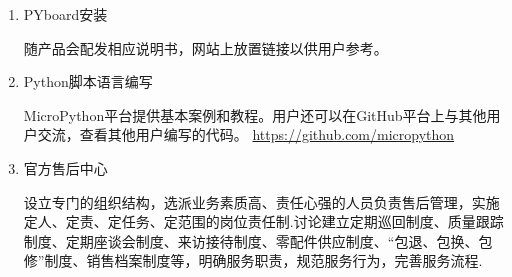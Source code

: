 \begin{enumerate}[(1)]
\item PYboard安装

      随产品会配发相应说明书，网站上放置链接以供用户参考。

\item Python脚本语言编写

      MicroPython平台提供基本案例和教程。用户还可以在GitHub平台上与其他用户交流，查看其他用户编写的代码。
      \url{https://github.com/micropython}

\item 官方售后中心

      设立专门的组织结构，选派业务素质高、责任心强的人员负责售后管理，实施定人、定责、定任务、定范围的岗位责任制.讨论建立定期巡回制度、质量跟踪制度、定期座谈会制度、来访接待制度、零配件供应制度、“包退、包换、包修”制度、销售档案制度等，明确服务职责，规范服务行为，完善服务流程.
\end{enumerate}

